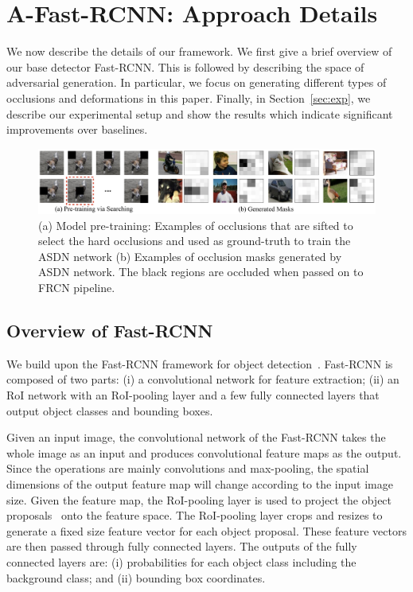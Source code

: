 
\section{A-Fast-RCNN: Approach Details}
We now describe the details of our framework. We first give a brief overview of our base detector Fast-RCNN. This is followed by describing the space of adversarial generation. In particular, we focus on generating different types of occlusions and deformations in this paper. Finally, in Section~\ref{sec:exp}, we describe our experimental setup and show the results which indicate significant improvements over baselines.

\begin{figure}
    \centering
    \includegraphics[width=1\textwidth]{masks.pdf}
    \caption{(a) Model pre-training: Examples of occlusions that are sifted to select the hard occlusions and used as ground-truth to train the ASDN network  (b) Examples of occlusion masks generated by ASDN network. The black regions are occluded when passed on to FRCN pipeline. }\label{fig:ASDN}
\end{figure}

\subsection{Overview of Fast-RCNN}
We build upon the Fast-RCNN framework for object detection~\cite{frcn}. Fast-RCNN is composed of two parts: (i) a convolutional network for feature extraction; (ii) an RoI network with an  RoI-pooling layer and a few fully connected layers that output object classes and bounding boxes. 

Given an input image, the convolutional network of the Fast-RCNN takes the whole image as an input and produces convolutional feature maps as the output. Since the operations are mainly convolutions and max-pooling, the spatial dimensions of the output feature map will change according to the input image size. Given the feature map, the RoI-pooling layer is used to project the object proposals~\cite{Uijlings13} onto the feature space. The RoI-pooling layer crops and resizes to generate a fixed size feature vector for each object proposal. These feature vectors are then passed through fully connected layers. The outputs of the fully connected layers are: (i) probabilities for each object class including the background class; and (ii) bounding box coordinates. 

